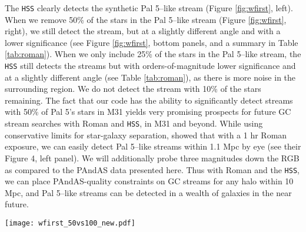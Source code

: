 \documentclass[twocolumn]{aastex631}
\begin{document}
The \texttt{HSS} clearly detects the synthetic Pal 5--like stream (Figure \ref{fig:wfirst}, left).
When we remove 50\% of the stars in the Pal 5--like stream (Figure \ref{fig:wfirst}, right), we still detect the stream, but at a slightly different angle and with a lower significance (see Figure \ref{fig:wfirst}, bottom panels, and a summary in Table \ref{tab:roman}).
When we only include 25\% of the stars in the Pal 5--like stream, the \texttt{HSS} still detects the streams but with orders-of-magnitude lower significance and at a slightly different angle (see Table \ref{tab:roman}), as there is more noise in the surrounding region. We do not detect the stream with 10\% of the stars remaining. 
The fact that our code has the ability to significantly detect streams with 50\% of Pal 5's stars in M31 yields very promising prospects for future GC stream searches with Roman and \texttt{HSS}, in M31 and beyond. While using conservative limits for star-galaxy separation,  showed that with a 1 hr Roman exposure, we can easily detect Pal 5--like streams within 1.1 Mpc by eye (see their Figure 4, left panel). We will additionally probe three magnitudes down the RGB as compared to the PAndAS data presented here. Thus with Roman and the \texttt{HSS}, we can place PAndAS-quality constraints on GC streams for any halo within 10 Mpc, and Pal 5--like streams can be detected in a wealth of galaxies in the near future.



\begin{figure*}
\centerline{\texttt{[image: wfirst\_50vs100\_new.pdf]}}
\caption{Top panels: input data to \texttt{HSS} with resolved stars in M31 background with Roman limiting magnitudes and a Pal 5 stream (a) and a stream with 50\% of Pal 5 (b) injected with an updated number of stars for a limiting magnitude of 1 hr Roman exposure at the distance of M31. The purple stripes show the streams detected by the \texttt{HSS}.  Middle panels:  the Hough transform of each star from the top panel shown in a $(\theta,\rho)$-grid where each bin has a certain number of stars, $k$, corresponding to how many sinusoidal curves crossed this bin, which was $\approx 1250$ stars for the Pal 5--like stream (a) and ${\approx}800$ stars for the stream with 50\% of Pal 5 stars (b).
Lower panels:  the probability of the $(\theta,\rho)$-grid (middle) having $k$ or more stars cross each specific bin, by chance (Eq. \ref{eq:binomial}). The purple dashed lines highlight the flagged stream detection (corresponding to the purple ‘stripe’ in the top panels). Note that the probability distribution for case b (lower right) is slightly more noisy. Roman combined with \texttt{HSS} will thus allow us to detect GC streams much fainter than Pal 5 in hundreds of galaxies.
}
\label{fig:wfirst}
\end{figure*}
\end{document}
